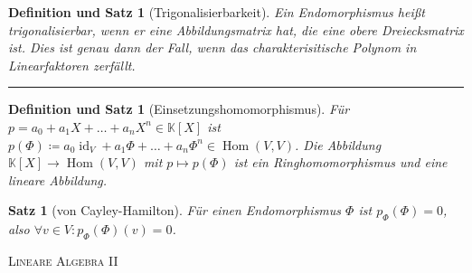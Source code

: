 \documentclass[a4paper]{article}
\newcounter{Sec}
\theoremstyle{marginbreak}
\newtheorem{satz}[definition]{Satz}
\newtheorem{defsatz}[definition]{Definition und Satz}
\DeclareMathOperator{\Hom}{Hom}
\DeclareMathOperator{\id}{id}
\newcommand{\sep}{%
	\rule{\textwidth}{0.3pt}%
	\stepcounter{Sec}%
	}
\begin{document}
	\begin{defsatz}[Trigonalisierbarkeit]
		Ein Endomorphismus heißt trigonalisierbar, wenn er eine Abbildungsmatrix hat,
		die eine obere Dreiecksmatrix ist. Dies ist genau dann der Fall, wenn das
		charakterisitische Polynom in Linearfaktoren zerfällt.
	\end{defsatz}
	\sep
	\begin{defsatz}[Einsetzungshomomorphismus]
		Für $p = a_0 + a_1X + \ldots + a_nX^n \in\mathbb{K}[X]$ ist $p(\Phi)\coloneqq a_0\id_V+a_1\Phi+\ldots+a_n\Phi^n \in\Hom(V, V)$.
		Die Abbildung $\mathbb{K}[X]\to\Hom(V, V)$ mit $p\mapsto p(\Phi)$ ist ein Ringhomomorphismus und eine lineare Abbildung.
	\end{defsatz}
	\begin{satz}[von Cayley-Hamilton]
		Für einen Endomorphismus $\Phi$ ist $p_\Phi(\Phi) = 0$, also $\forall v\in V: p_\Phi(\Phi)(v) = 0$.
	\end{satz}
	\newpage
	\textsc{Lineare Algebra II}
\end{document}
